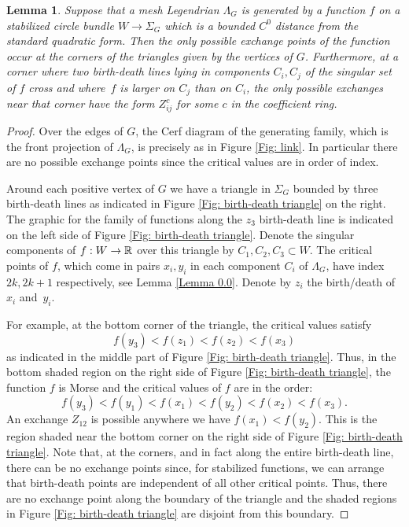 \documentclass[11pt]{article}
\numberwithin{equation}{section}\providecommand{\dpl}{\displaystyle}
\theoremstyle{plain}
\newtheorem{lemma}[theorem]{Lemma}
\theoremstyle{definition}
\begin{document}
\begin{lemma}\label{possible exchange points}
Suppose that a mesh Legendrian $\Lambda_G$ is generated by a function $f$ on a stabilized circle bundle $W \to \Sigma_G$ which is a bounded $C^0$ distance from the standard quadratic form. Then the only possible exchange points of the function occur at the corners of the triangles given by the vertices of $G$. Furthermore, at a corner where two birth-death lines lying in components $C_i,C_j$ of the singular set of $f$ cross and where~$f$ is larger on $C_j$ than on $C_i$, the only possible exchanges near that corner have the form $Z_{ij}^c$ for some $c$ in the coefficient ring.
\end{lemma}

\begin{proof}
Over the edges of $G$, the Cerf diagram of the generating family, which is the front projection of $\Lambda_G$, is precisely as in Figure \ref{Fig: link}. In particular there are no possible exchange points since the critical values are in order of index.

Around each positive vertex of $G$ we have a triangle in $\Sigma_G$ bounded by three birth-death lines as indicated in Figure \ref{Fig: birth-death triangle} on the right. The graphic for the family of functions along the $z_3$ birth-death line is indicated on the left side of Figure \ref{Fig: birth-death triangle}. Denote the singular components of $f:W \to \mathbb{R}$ over this triangle by $C_1,C_2,C_3 \subset W$. The critical points of $f$, which come in pairs $x_i,y_i$ in each component $C_i$ of $\Lambda_G$, have index $2k, 2k+1$ respectively, see Lemma \ref{Lemma 0.0}. Denote by $z_i$ the birth/death of~$x_i$ and~$y_i$.

For example, at the bottom corner of the triangle, the critical values satisfy
\[
f(y_3)<f(z_1)<f(z_2)<f(x_3)
\]
as indicated in the middle part of Figure \ref{Fig: birth-death triangle}. Thus, in the bottom shaded region on the right side of Figure \ref{Fig: birth-death triangle}, the function $f$ is Morse and the critical values of $f$ are in the order:
\[
f(y_3)< f(y_1)< \boxed{f(x_1)< f(y_2)}<f(x_2)<f(x_3).
\]
An exchange $Z_{12}$ is possible anywhere we have $f(x_1)<f(y_2)$. This is the region shaded near the bottom corner on the right side of Figure \ref{Fig: birth-death triangle}. Note that, at the corners, and in fact along the entire birth-death line, there can be no exchange points since, for stabilized functions, we can arrange that birth-death points are independent of all other critical points. Thus, there are no exchange point along the boundary of the triangle and the shaded regions in Figure \ref{Fig: birth-death triangle} are disjoint from this boundary.


\end{proof}
\end{document}
